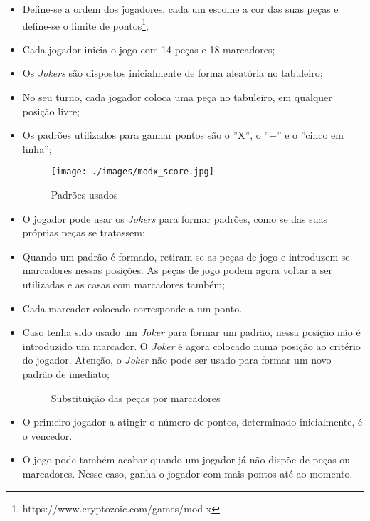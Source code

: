 \documentclass[a4paper]{article}
\begin{document}
\begin{itemize}
	\item Define-se a ordem dos jogadores, cada um escolhe a cor das suas peças e define-se o limite de pontos\footnote{https://www.cryptozoic.com/games/mod-x};
	\item Cada jogador inicia o jogo com 14 peças e 18 marcadores;
	\item Os \textit{Jokers} são dispostos inicialmente de forma aleatória no tabuleiro; 
	\item No seu turno, cada jogador coloca uma peça no tabuleiro, em qualquer posição livre;
	\item Os padrões utilizados para ganhar pontos são o ''X'', o ''+'' e o ''cinco em linha'';
	
	\begin{figure}[h!]
		\begin{center}
			\texttt{[image: ./images/modx\_score.jpg]}
			\caption{Padrões usados}
			\label{fig:2}
		\end{center}
	\end{figure}
	
	\item O jogador pode usar os \textit{Jokers} para formar padrões, como se das suas próprias peças se tratassem;
	\item Quando um padrão é formado, retiram-se as peças de jogo e introduzem-se marcadores nessas posições. As peças de jogo podem agora voltar a ser utilizadas e as casas com marcadores também;
	\item Cada marcador colocado corresponde a um ponto.
	\item Caso tenha sido usado um \textit{Joker} para formar um padrão, nessa posição não é introduzido um marcador. O \textit{Joker} é agora colocado numa posição ao critério do jogador. Atenção, o \textit{Joker} não pode ser usado para formar um novo padrão de imediato; 
	
	\begin{figure}[!tbp]
		\centering
		\hfill
		\caption{Substituição das peças por marcadores}
	\end{figure}
	
	\item O primeiro jogador a atingir o número de pontos, determinado inicialmente, é o vencedor.
	\item O jogo pode também acabar quando um jogador já não dispõe de peças ou marcadores. Nesse caso, ganha o jogador com mais pontos até ao momento. 
	

	
\end{itemize}
\end{document}

